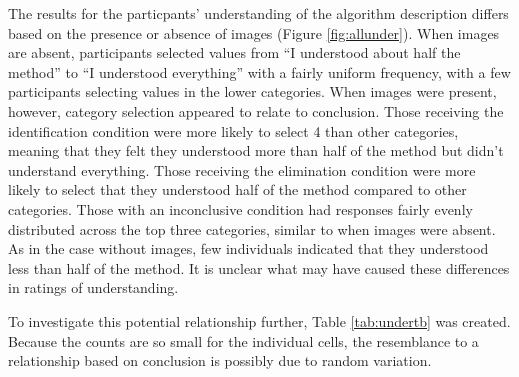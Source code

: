 \documentclass[print]{nuthesis}
\begin{document}
The results for the particpants' understanding of the algorithm description differs based on the presence or absence of images (Figure \ref{fig:allunder}).
When images are absent, participants selected values from ``I understood about half the method'' to ``I understood everything'' with a fairly uniform frequency, with a few participants selecting values in the lower categories.
When images were present, however, category selection appeared to relate to conclusion.
Those receiving the identification condition were more likely to select 4 than other categories, meaning that they felt they understood more than half of the method but didn't understand everything.
Those receiving the elimination condition were more likely to select that they understood half of the method compared to other categories.
Those with an inconclusive condition had responses fairly evenly distributed across the top three categories, similar to when images were absent.
As in the case without images, few individuals indicated that they understood less than half of the method.
It is unclear what may have caused these differences in ratings of understanding.

To investigate this potential relationship further, Table \ref{tab:undertb} was created. Because the counts are so small for the individual cells, the resemblance to a relationship based on conclusion is possibly due to random variation.
\end{document}
